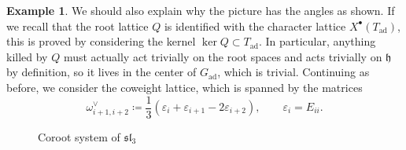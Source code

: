 \documentclass{amsart}
\theoremstyle{definition}
\newtheorem{exm}[thm]{Example}
\theoremstyle{remark}
\theoremstyle{plain}
\theoremstyle{definition}
\theoremstyle{remark}
\newcommand{\h}{\mathfrak{h}}
\newcommand{\ep}{\varepsilon}
\newcommand{\mf}[1]{\mathfrak{#1}}
\newcommand{\1}{\mathbf{1}}
\newcommand{\2}{\mathbf{2}}
\newcommand{\3}{\mathbf{3}}
\renewcommand{\sl}{\mf{sl}}
\DeclareMathOperator{\ad}{ad}
\begin{document}
\begin{exm}
    We should also explain why the picture has the angles as shown. If we recall that the root lattice \(Q\) is identified with the character lattice \(X^{\bullet}(T_{\ad})\), this is proved by considering the kernel \(\ker Q \subset T_{\ad}\). In particular, anything killed by \(Q\) must actually act trivially on the root spaces and acts trivially on \(\h\) by definition, so it lives in the center of \(G_{\ad}\), which is trivial. Continuing as before, we consider the coweight lattice, which is spanned by the matrices
    \[ \omega_{i+1,i+2}^{\vee} \coloneqq\frac{1}{3} (\ep_i + \ep_{i+1} - 2 \ep_{i+2}), \qquad \ep_i = E_{ii}. \]

    \begin{figure}[htpb]
    \begin{center}
    \end{center}
    \caption{Coroot system of \(\sl_3\)}%
    \label{fig:sl3-coroots}
    \end{figure}
\end{exm}
\end{document}

